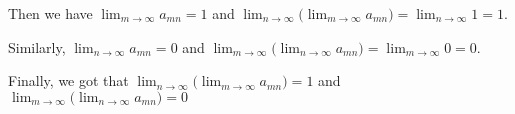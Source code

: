 \documentclass[11pt]{article}
\begin{document}
\begin{itemize}
\begin{itemize}
                Then we have $\lim_{m \to \infty}a_{mn} = 1$ and
                $\lim_{n \to \infty}\Big(\lim_{m \to \infty}a_{mn}\Big) =
                \lim_{n \to \infty}1 = 1$.

                Similarly, $\lim_{n \to \infty}a_{mn} = 0$ and
                $\lim_{m \to \infty}\Big(\lim_{n \to \infty}a_{mn}\Big) =
                \lim_{m \to \infty}0 = 0$.

                Finally, we got that
                $\lim_{n \to \infty}\Big(\lim_{m \to \infty}a_{mn}\Big) = 1$
                and
                $\lim_{m \to \infty}\Big(\lim_{n \to \infty}a_{mn}\Big) = 0$
        \end{itemize}
\end{itemize}

\end{document}
